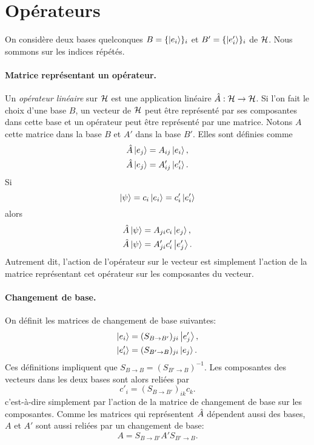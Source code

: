 \documentclass[11pt,a4paper,oneside]{article}
\begin{document}
\section{Opérateurs}

On considère deux bases quelconques $B=\{\ket{e_i}\}_i$ et $B'=\{\ket{e'_i}\}_i$ de $\mathcal{H}$. Nous sommons sur les indices répétés.

\paragraph{Matrice représentant un opérateur.} Un \emph{opérateur linéaire} sur $\mathcal{H}$ est une application linéaire $\hat{A}:\mathcal{H}\to\mathcal{H}$. Si l'on fait le choix d'une base $B$, un vecteur de $\mathcal{H}$ peut être représenté par ses composantes dans cette base et un opérateur peut être représenté par une matrice. Notons $A$ cette matrice dans la base $B$ et $A'$ dans la base $B'$. Elles sont définies comme
\begin{align}
    \hat{A}\ket{e_j} &= A_{ij}\ket{e_i},\\
    \hat{A}\ket{e_j} &= A'_{ij}\ket{e'_i}.
\end{align}
Si
\begin{equation}
    \ket{\psi_{}}=c_i\ket{e_i}=c'_i\ket{e'_i}
\end{equation}
alors
\begin{align}
    \hat{A}\ket{\psi_{}} &= A_{ji}c_i \ket{e_j},\label{eq:matreprA}\\
    \hat{A}\ket{\psi_{}} &= A'_{ji}c'_i \ket{e'_j}.
\end{align}
Autrement dit, l'action de l'opérateur sur le vecteur est simplement l'action de la matrice représentant cet opérateur sur les composantes du vecteur.

\paragraph{Changement de base.} On définit les matrices de changement de base suivantes:
\begin{align}
    \ket{e_i} &= (S_{B\to B'})_{ji}\ket{e'_j},\\
    \ket{e'_i} &= (S_{B'\to B})_{ji}\ket{e_j}.
\end{align}
Ces définitions impliquent que $S_{B\to B}=(S_{B'\to B})^{-1}$. Les composantes des vecteurs dans les deux bases sont alors reliées par
\begin{equation}
    \boxed{c'_i = (S_{B\to B'})_{ik}c_k}.
\end{equation}
c'est-à-dire simplement par l'action de la matrice de changement de base sur les composantes. Comme les matrices qui représentent $\hat{A}$ dépendent aussi des bases, $A$ et $A'$ sont aussi reliées par un changement de base:
\begin{equation}
    \boxed{A=S_{B\to B'}A'S_{B'\to B}}.
\end{equation}
\end{document}
